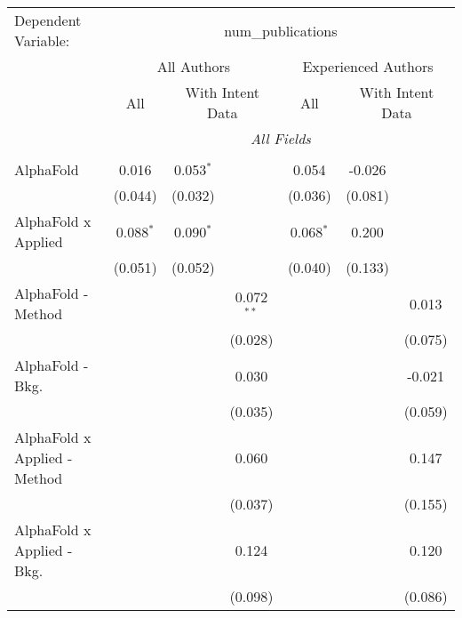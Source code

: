 \begingroup
\centering
\begin{tabular}{lcccccc}
   \tabularnewline \midrule \midrule
   Dependent Variable: & \multicolumn{6}{c}{num\_publications}\\
 & \multicolumn{3}{c}{All Authors} & \multicolumn{3}{c}{Experienced Authors} \\
\cmidrule(lr){2-4} \cmidrule(lr){5-7}
 & \multicolumn{1}{c}{All} & \multicolumn{2}{c}{With Intent Data} & \multicolumn{1}{c}{All} & \multicolumn{2}{c}{With Intent Data} \\
\cmidrule(lr){2-2} \cmidrule(lr){3-4} \cmidrule(lr){5-5} \cmidrule(lr){6-7}
 & \multicolumn{6}{c}{\textit{All Fields}} \\ \\
   AlphaFold                      & 0.016         & 0.053$^{*}$   &               & 0.054         & -0.026       &   \\   
                                  & (0.044)       & (0.032)       &               & (0.036)       & (0.081)      &   \\   
   AlphaFold x Applied            & 0.088$^{*}$   & 0.090$^{*}$   &               & 0.068$^{*}$   & 0.200        &   \\   
                                  & (0.051)       & (0.052)       &               & (0.040)       & (0.133)      &   \\   
   AlphaFold - Method             &               &               & 0.072$^{**}$  &               &              & 0.013\\   
                                  &               &               & (0.028)       &               &              & (0.075)\\   
   AlphaFold - Bkg.               &               &               & 0.030         &               &              & -0.021\\   
                                  &               &               & (0.035)       &               &              & (0.059)\\   
   AlphaFold x Applied - Method   &               &               & 0.060         &               &              & 0.147\\   
                                  &               &               & (0.037)       &               &              & (0.155)\\   
   AlphaFold x Applied - Bkg.     &               &               & 0.124         &               &              & 0.120\\   
                                  &               &               & (0.098)       &               &              & (0.086)\\   

\end{tabular}
